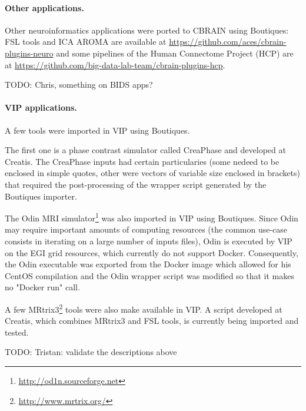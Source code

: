 \documentclass{article}
\newcommand{\todo}[1]{\color{red}TODO: #1\color{black}}
\begin{document}
\paragraph{Other applications.} Other neuroinformatics applications were ported to CBRAIN using Boutiques:
FSL tools and ICA AROMA are available at
\url{https://github.com/aces/cbrain-plugins-neuro} and some pipelines
of the Human Connectome Project (HCP) are at
\url{https://github.com/big-data-lab-team/cbrain-plugins-hcp}.

\todo{Chris, something on BIDS apps?}


\paragraph{VIP applications.}A few tools were imported in VIP using Boutiques. 

The first one is a phase contrast simulator called CreaPhase and developed at Creatis. 
The CreaPhase inputs had certain particularies (some nedeed to be enclosed 
in simple quotes, other were vectors of variable size enclosed in brackets)
that required the post-processing of the wrapper script generated by the
Boutiques importer. 

The Odin MRI simulator\footnote{\url{http://od1n.sourceforge.net}} was also imported 
in VIP using Boutiques. Since Odin  may require important amounts of computing resources 
(the common use-case consists in iterating on a large number of inputs files), Odin is 
executed by VIP on the EGI grid resources, which currently do not support Docker. Consequently, 
the Odin executable was exported from the Docker image which allowed for his CentOS compilation
and the Odin wrapper script was modified so that it makes no "Docker run" call.

A few MRtrix3\footnote{\url{http://www.mrtrix.org/}} tools were also make available in VIP. 
A script developed at Creatis, which combines MRtrix3 and FSL tools, is currently being
imported and tested.

\todo{Tristan: validate the descriptions above}
\end{document}
